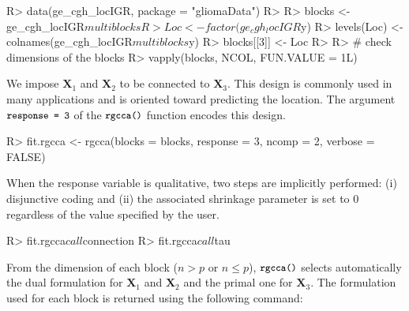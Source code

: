 \documentclass[
]{jss}
\begin{document}
\normalsize

\footnotesize

\begin{CodeChunk}
\begin{CodeInput}
R> data(ge_cgh_locIGR, package = "gliomaData")
R> 
R> blocks <- ge_cgh_locIGR$multiblocks
R> Loc <- factor(ge_cgh_locIGR$y)
R> levels(Loc) <- colnames(ge_cgh_locIGR$multiblocks$y)
R> blocks[[3]] <- Loc
R> 
R> # check dimensions of the blocks
R> vapply(blocks, NCOL, FUN.VALUE = 1L)
\end{CodeInput}
\end{CodeChunk}

\normalsize

We impose \(\mathbf{X}_1\) and \(\mathbf{X}_2\) to be connected to
\(\mathbf{X}_3\). This design is commonly used in many applications and
is oriented toward predicting the location. The argument
\(\small{\texttt{response = 3}}\) of the \(\small{\texttt{rgcca()}}\)
function encodes this design.

\footnotesize

\begin{CodeChunk}
\begin{CodeInput}
R> fit.rgcca <- rgcca(blocks = blocks, response = 3, ncomp = 2, verbose = FALSE)
\end{CodeInput}
\end{CodeChunk}

\normalsize

When the response variable is qualitative, two steps are implicitly
performed: (i) disjunctive coding and (ii) the associated shrinkage
parameter is set to \(0\) regardless of the value specified by the user.

\footnotesize

\begin{CodeChunk}
\begin{CodeInput}
R> fit.rgcca$call$connection
R> fit.rgcca$call$tau
\end{CodeInput}
\end{CodeChunk}

\normalsize

From the dimension of each block (\(n>p\) or \(n\leq p\)),
\(\small{\texttt{rgcca()}}\) selects automatically the dual formulation
for \(\mathbf{X}_1\) and \(\mathbf{X}_2\) and the primal one for
\(\mathbf{X}_3\). The formulation used for each block is returned using
the following command:

\footnotesize

\begin{CodeChunk}
\end{CodeChunk}
\end{document}
